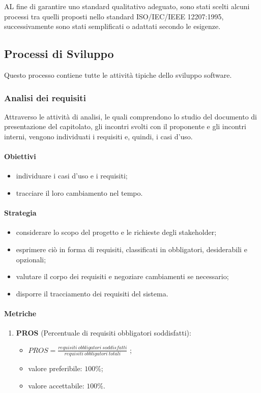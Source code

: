AL fine di garantire uno standard qualitativo adeguato, sono stati scelti alcuni processi tra quelli proposti nello standard ISO/IEC/IEEE 12207:1995,
successivamente sono stati semplificati o adattati secondo le esigenze.

\subsection{Processi di Sviluppo}
    Questo processo contiene tutte le attività tipiche dello sviluppo software.
    \subsubsection{Analisi dei requisiti}
        Attraverso le attivit\`{a} di analisi, le quali comprendono lo studio del documento di presentazione del capitolato, gli incontri svolti con il proponente e gli incontri interni, vengono individuati i requisiti e, quindi, i casi d'uso.   

        \paragraph{Obiettivi}
            \begin{itemize}
                \item individuare i casi d'uso e i requisiti;
                \item tracciare il loro cambiamento nel tempo.
            \end{itemize}
        \paragraph{Strategia}
            \begin{itemize}
                \item considerare lo scopo del progetto e le richieste degli stakeholder;
                \item esprimere ciò in forma di requisiti, classificati in obbligatori, desiderabili e opzionali;
                \item valutare il corpo dei requisiti e negoziare cambiamenti se necessario;
                \item disporre il tracciamento dei requisiti del sistema.
            \end{itemize}
        \paragraph{Metriche}
            \begin{enumerate}
                \item \textbf{PROS} (Percentuale di requisiti obbligatori soddisfatti):
                \begin{itemize}
                    \item $PROS = \frac{requisiti\ obbligatori\ soddisfatti}{requisiti\ obbligatori\ totali}$ ;
                    \item valore preferibile: $100\%$;
                    \item valore accettabile: $100\%$.
                \end{itemize}
            \end{enumerate}
